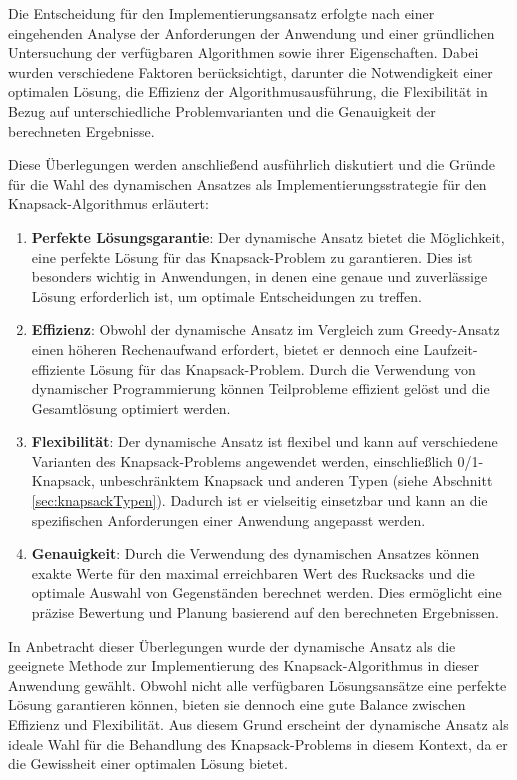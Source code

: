 Die Entscheidung für den Implementierungsansatz erfolgte nach einer eingehenden Analyse der Anforderungen der Anwendung
und einer gründlichen Untersuchung der verfügbaren Algorithmen sowie ihrer Eigenschaften. Dabei wurden verschiedene
Faktoren berücksichtigt, darunter die Notwendigkeit einer optimalen Lösung, die Effizienz der Algorithmusausführung, die
Flexibilität in Bezug auf unterschiedliche Problemvarianten und die Genauigkeit der berechneten Ergebnisse.

Diese Überlegungen werden anschließend ausführlich diskutiert und die Gründe für die Wahl des dynamischen Ansatzes als
Implementierungsstrategie für den Knapsack-Algorithmus erläutert:
\begin{enumerate}
\item \textbf{Perfekte Lösungsgarantie}: Der dynamische Ansatz bietet die Möglichkeit, eine perfekte Lösung für das
Knapsack-Problem zu garantieren. Dies ist besonders wichtig in Anwendungen, in denen eine genaue und zuverlässige
Lösung erforderlich ist, um optimale Entscheidungen zu treffen.
\item \textbf{Effizienz}: Obwohl der dynamische Ansatz im Vergleich zum Greedy-Ansatz einen höheren Rechenaufwand
erfordert, bietet er dennoch eine Laufzeit-effiziente Lösung für das Knapsack-Problem. Durch die Verwendung von dynamischer
Programmierung können Teilprobleme effizient gelöst und die Gesamtlösung optimiert werden.
\item \textbf{Flexibilität}: Der dynamische Ansatz ist flexibel und kann auf verschiedene Varianten des Knapsack-Problems
angewendet werden, einschließlich 0/1-Knapsack, unbeschränktem Knapsack und anderen Typen (siehe Abschnitt \ref{sec:knapsackTypen}). Dadurch ist er vielseitig
einsetzbar und kann an die spezifischen Anforderungen einer Anwendung angepasst werden.
\item \textbf{Genauigkeit}: Durch die Verwendung des dynamischen Ansatzes können exakte Werte für den maximal erreichbaren
Wert des Rucksacks und die optimale Auswahl von Gegenständen berechnet werden. Dies ermöglicht eine präzise Bewertung
und Planung basierend auf den berechneten Ergebnissen.
\end{enumerate}

In Anbetracht dieser Überlegungen wurde der dynamische Ansatz als die geeignete Methode zur Implementierung des Knapsack-Algorithmus
in dieser Anwendung gewählt. Obwohl nicht alle verfügbaren Lösungsansätze eine perfekte Lösung garantieren können, bieten
sie dennoch eine gute Balance zwischen Effizienz und Flexibilität. Aus diesem Grund erscheint der dynamische Ansatz als
ideale Wahl für die Behandlung des Knapsack-Problems in diesem Kontext, da er die Gewissheit einer optimalen Lösung bietet.

